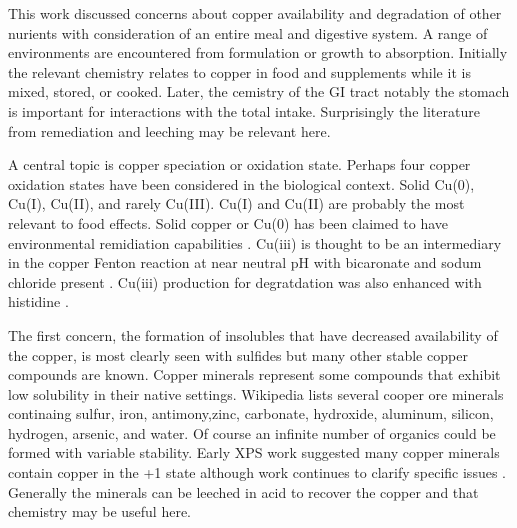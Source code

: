 

This work discussed concerns about copper availability and
degradation of other nurients with consideration of an entire
meal and digestive system. A range of environments
are encountered from formulation or growth to absorption.  
Initially the relevant chemistry relates to copper in food
and supplements while it is mixed, stored, or cooked.
Later, the cemistry of the GI tract notably the stomach
is important for interactions with the total intake. 
Surprisingly the literature from remediation and leeching
may be relevant here. 

A central topic  is copper speciation or oxidation state.
Perhaps four copper oxidation states have been 
considered in the biological context. Solid Cu(0),
Cu(I), Cu(II), and rarely Cu(III). Cu(I) and Cu(II)
are probably the most relevant to food effects. 
Solid copper or Cu(0) has been claimed to have
environmental remidiation capabilities
\cite{deSousa2019}.
Cu(iii) is thought to be an intermediary in the
copper Fenton reaction at near neutral pH with
bicaronate and sodum chloride present
\cite{Pham_Xing_Miller_Fenton_like_copper_redox_2013}.
Cu(iii) production for degratdation was also enhanced
with histidine
\cite{Park_Lee_Kim_Trivalent_Copper_Mediated_2024}.


The first  concern,   the formation of insolubles that
have decreased availability of the copper, is most clearly seen
with sulfides but many other stable copper compounds
are known. Copper minerals represent some compounds that
exhibit low solubility in their native settings. Wikipedia lists
several cooper ore minerals \cite{Wikimediaprojects_List_copper_ores_2024}
continaing sulfur, iron, antimony,zinc, carbonate, hydroxide, aluminum,
silicon, hydrogen, arsenic, and water.  Of course an infinite
number of organics could be formed with variable stability.
Early XPS work suggested many copper minerals contain copper
in the +1 state \cite{NAKAI_IZAWA_SUGITANI_photoelectron_spectroscopic_1976}
although work continues to clarify specific issues
\cite{Goh_Buckley_Lamb_oxidation_states_2006}.
Generally the minerals can be leeched in acid to recover the copper
and that chemistry may be useful here.  

